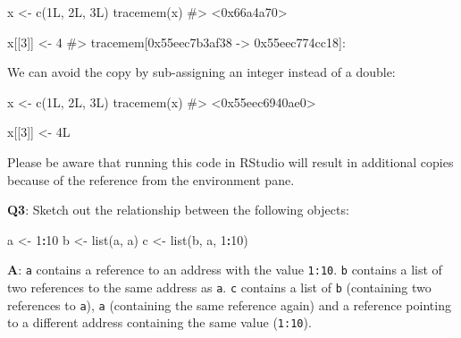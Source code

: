 \documentclass[
]{krantz}
\makeatletter
\newenvironment{Shaded}{\begin{snugshade}}{\end{snugshade}}
\newcommand{\CommentTok}[1]{\textcolor[rgb]{0.56,0.35,0.01}{\textit{#1}}}
\newcommand{\DecValTok}[1]{\textcolor[rgb]{0.00,0.00,0.81}{#1}}
\newcommand{\KeywordTok}[1]{\textcolor[rgb]{0.13,0.29,0.53}{\textbf{#1}}}
\newcommand{\NormalTok}[1]{#1}
\newcommand{\OperatorTok}[1]{\textcolor[rgb]{0.81,0.36,0.00}{\textbf{#1}}}
\newcommand{\StringTok}[1]{\textcolor[rgb]{0.31,0.60,0.02}{#1}}
\newenvironment{kframe}{%
\medskip{}
\setlength{\fboxsep}{.8em}
 \def\at@end@of@kframe{}%
 \ifinner\ifhmode%
  \def\at@end@of@kframe{\end{minipage}}%
  \begin{minipage}{\columnwidth}%
 \fi\fi%
 \def\FrameCommand##1{\hskip\@totalleftmargin \hskip-\fboxsep
 \colorbox{shadecolor}{##1}\hskip-\fboxsep
     \hskip-\linewidth \hskip-\@totalleftmargin \hskip\columnwidth}%
 \MakeFramed {\advance\hsize-\width
   \@totalleftmargin\z@ \linewidth\hsize
   \@setminipage}}%
 {\par\unskip\endMakeFramed%
 \at@end@of@kframe}
\renewenvironment{Shaded}{\begin{kframe}}{\end{kframe}}
\renewcommand{\KeywordTok} [1]{\textcolor[rgb]{0.00,0.44,0.13}{{#1}}}
\renewcommand{\DecValTok}  [1]{\textcolor[rgb]{0.25,0.63,0.44}{{#1}}}
\renewcommand{\StringTok}  [1]{\textcolor[rgb]{0.25,0.44,0.63}{{#1}}}
\renewcommand{\CommentTok} [1]{\textcolor[rgb]{0.38,0.63,0.69}{{#1}}}
\renewcommand{\NormalTok}  [1]{{#1}}
\makeatother
\begin{document}
\begin{Shaded}
\begin{Highlighting}[]
\NormalTok{x <-}\StringTok{ }\KeywordTok{c}\NormalTok{(1L, 2L, 3L)}
\KeywordTok{tracemem}\NormalTok{(x)}
\CommentTok{#> <0x66a4a70>}

\NormalTok{x[[}\DecValTok{3}\NormalTok{]] <-}\StringTok{ }\DecValTok{4}
\CommentTok{#> tracemem[0x55eec7b3af38 -> 0x55eec774cc18]: }
\end{Highlighting}
\end{Shaded}

We can avoid the copy by sub-assigning an integer instead of a double:

\begin{Shaded}
\begin{Highlighting}[]
\NormalTok{x <-}\StringTok{ }\KeywordTok{c}\NormalTok{(1L, 2L, 3L)}
\KeywordTok{tracemem}\NormalTok{(x)}
\CommentTok{#> <0x55eec6940ae0>}

\NormalTok{x[[}\DecValTok{3}\NormalTok{]] <-}\StringTok{ }\NormalTok{4L}
\end{Highlighting}
\end{Shaded}

Please be aware that running this code in RStudio will result in additional copies because of the reference from the environment pane.

\textbf{{Q3}}: Sketch out the relationship between the following objects:

\begin{Shaded}
\begin{Highlighting}[]
\NormalTok{a <-}\StringTok{ }\DecValTok{1}\OperatorTok{:}\DecValTok{10}
\NormalTok{b <-}\StringTok{ }\KeywordTok{list}\NormalTok{(a, a)}
\NormalTok{c <-}\StringTok{ }\KeywordTok{list}\NormalTok{(b, a, }\DecValTok{1}\OperatorTok{:}\DecValTok{10}\NormalTok{)}
\end{Highlighting}
\end{Shaded}

\textbf{{A}}: \texttt{a} contains a reference to an address with the value \texttt{1:10}. \texttt{b} contains a list of two references to the same address as \texttt{a}. \texttt{c} contains a list of \texttt{b} (containing two references to \texttt{a}), \texttt{a} (containing the same reference again) and a reference pointing to a different address containing the same value (\texttt{1:10}).
\end{document}
